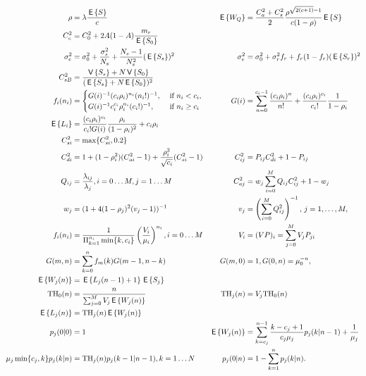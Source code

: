 \begin{align*}
\rho &= \lambda \frac{\,\mathsf{E}\left\{S\right\}}{c} &   \,\mathsf{E}\left\{W_Q\right\} &= \frac{C_a^2 + C_s^2}{2} \frac{\rho^{\sqrt{2(c+1)}-1}}{c(1-\rho)} \,\mathsf{E}\left\{S\right\}\\
C_e^2 &= C_0^2 + 2A(1-A)\frac{m_r}{\,\mathsf{E}\left\{S_0\right\}} \\
\sigma_e^2 &= \sigma_0^2 + \frac{\sigma_s^2}{N_s} + \frac{N_s -1}{N_s^2}(\,\mathsf{E}\left\{S_s\right\})^2 
& \sigma_e^2 &= \sigma_0^2 + \sigma_r^2 f_r + f_r(1-f_r)(\,\mathsf{E}\left\{S_r\right\})^2 \\
C_{sB}^2 &= \frac{\,\mathsf{V}\left\{S_s\right\} + N \,\mathsf{V}\left\{S_0\right\}}{(\,\mathsf{E}\left\{S_s\right\} + N \,\mathsf{E}\left\{S_0\right\})^2}\\
f_i(n_i) &= 
           \begin{cases}
             G(i)^{-1} (c_i\rho_i)^{n_i}(n_i!)^{-1}, &\text{ if } n_i < c_i, \\ 
             G(i)^{-1} c_i^{c_i}\rho_i^{n_i}(c_i!)^{-1}, &\text{ if } n_i \geq c_i \\ 
           \end{cases} 
& G(i) &= \sum_{n=0}^{c_i-1} \frac{(c_i\rho_i)^n}{n!} + \frac{(c_i\rho_i)^{c_i}}{c_i!}\frac{1}{1-\rho_i} \\
\,\mathsf{E}\left\{L_i\right\} &= \frac{(c_i\rho_i)^{c_i}}{c_i!G(i)}\frac{\rho_i}{(1-\rho_i)^2} + c_i \rho_i \\
C_{si}^2 &= \max\{C_{si}^2, 0.2\} \\
C_{di}^2 &= 1 + (1-\rho_i^2)(C_{ai}^2 - 1) + \frac{\rho_i^2}{\sqrt{c_i}}(C_{si}^2-1) 
& C_{ij}^2 &= P_{ij}C_{di}^2 + 1 - P_{ij}\\
Q_{ij} &= \frac{\lambda_{ij}}{\lambda_j}, i=0\ldots M, j=1\ldots M & C_{aj}^2 &= w_j\sum_{i=0}^M Q_{ij}C_{ij}^2 + 1 - w_j \\
w_j &= (1+4(1-\rho_j)^2(v_j-1))^{-1} & 
v_j &= \left(\sum_{i=0}^M Q_{ij}^2\right)^{-1}, \, j=1,\ldots, M,\\
f_{i}(n_i) &= \frac{1}{\Pi_{k=1}^{n_i} \min\{k, c_i\}}\left(\frac{V_i}{\mu_i}\right)^{n_i}, i=0\ldots M 
& V_i &= (V P)_i = \sum_{j=0}^M V_j P_{ji}\\
G(m,n) &= \sum_{k=0}^n f_m(k) G(m-1, n-k) &  G(m,0) &= 1, G(0,n) = \mu_0^{-n}, \\
\,\mathsf{E}\left\{W_j(n)\right\} &= \,\mathsf{E}\left\{L_j(n-1) + 1\right\} \,\mathsf{E}\left\{S_j\right\} \\
\mathrm{TH}_0(n) &= \frac{n}{\sum_{j=0}^M V_j \,\mathsf{E}\left\{W_j(n)\right\}}  &  \mathrm{TH}_j(n) &= V_j \mathrm{TH}_0(n) \\
\,\mathsf{E}\left\{L_j(n)\right\} &= \mathrm{TH}_j(n) \,\mathsf{E}\left\{W_j(n)\right\} \\
 p_j(0|0) & = 1  & \,\mathsf{E}\left\{W_j(n)\right\} &= \sum_{k=c_j}^{n-1} \frac{k-c_j+1}{c_j \mu_j} p_j(k|n-1) + \frac{1}{\mu_j} \\
\mu_j \min\{c_j,k\}p_j(k|n) &= \mathrm{TH}_j(n) p_j(k-1|n-1), k=1\ldots N & p_j(0|n) &= 1 - \sum_{k=1}^n p_j(k|n).
\end{align*}


